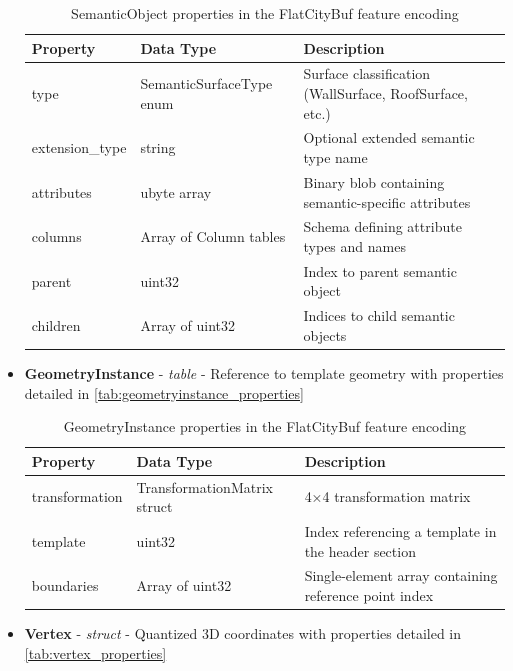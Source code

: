 \begin{itemize}
    \begin{table}[h]
      \centering
      \caption{SemanticObject properties in the FlatCityBuf feature encoding}
      \label{tab:semanticobject_properties}
      \small
      \begin{tabularx}{\textwidth}{@{}llX@{}}
        \toprule
        \textbf{Property} & \textbf{Data Type} & \textbf{Description} \\
        \midrule
        type & SemanticSurfaceType enum & Surface classification (WallSurface, RoofSurface, etc.) \\
        extension\_type & string & Optional extended semantic type name \\
        attributes & ubyte array & Binary blob containing semantic-specific attributes \\
        columns & Array of Column tables & Schema defining attribute types and names \\
        parent & uint32 & Index to parent semantic object \\
        children & Array of uint32 & Indices to child semantic objects \\
        \bottomrule
      \end{tabularx}
    \end{table}

  \item \textbf{GeometryInstance} - \textit{table} - Reference to template geometry with properties detailed in \autoref{tab:geometryinstance_properties}

    \begin{table}[h]
      \centering
      \caption{GeometryInstance properties in the FlatCityBuf feature encoding}
      \label{tab:geometryinstance_properties}
      \small
      \begin{tabularx}{\textwidth}{@{}llX@{}}
        \toprule
        \textbf{Property} & \textbf{Data Type} & \textbf{Description} \\
        \midrule
        transformation & TransformationMatrix struct & 4×4 transformation matrix \\
        template & uint32 & Index referencing a template in the header section \\
        boundaries & Array of uint32 & Single-element array containing reference point index \\
        \bottomrule
      \end{tabularx}
    \end{table}

  \item \textbf{Vertex} - \textit{struct} - Quantized 3D coordinates with properties detailed in \autoref{tab:vertex_properties}


\end{itemize}
